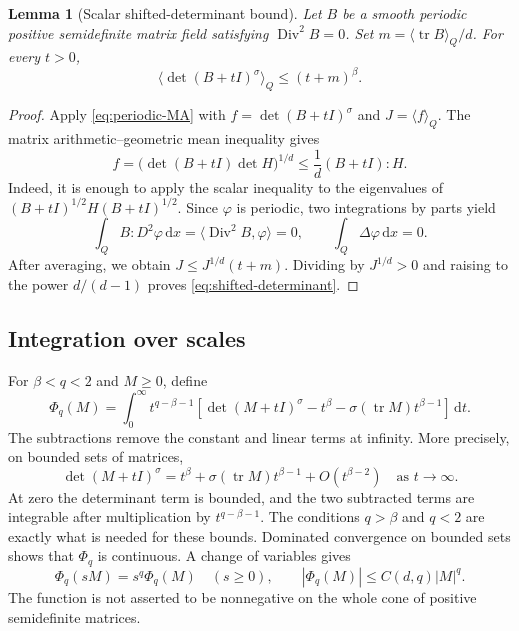 \documentclass[11pt,a4paper,reqno]{amsart}
\theoremstyle{plain}
\newtheorem{lemma}[theorem]{Lemma}
\theoremstyle{remark}
\numberwithin{equation}{section}
\newcommand{\dd}{\,\mathrm d}
\newcommand{\avg}[1]{\langle#1\rangle_Q}
\DeclareMathOperator{\tr}{tr}
\DeclareMathOperator{\Div}{Div}
\begin{document}
\begin{lemma}[Scalar shifted-determinant bound]\label{lem:determinant}
Let $B$ be a smooth periodic positive semidefinite matrix field satisfying $\Div^2B=0$. Set $m=\avg{\tr B}/d$. For every $t>0$,
\begin{equation}\label{eq:shifted-determinant}
 \avg{\det(B+tI)^\sigma}\le(t+m)^\beta.
\end{equation}
\end{lemma}
\begin{proof}
Apply \eqref{eq:periodic-MA} with $f=\det(B+tI)^\sigma$ and $J=\avg f$. The matrix arithmetic--geometric mean inequality gives
\[
 f=\bigl(\det(B+tI)\det H\bigr)^{1/d}
 \le\frac1d(B+tI):H.
\]
Indeed, it is enough to apply the scalar inequality to the eigenvalues of $(B+tI)^{1/2}H(B+tI)^{1/2}$. Since $\varphi$ is periodic, two integrations by parts yield
\[
 \int_Q B:D^2\varphi\dd x=\langle\Div^2B,\varphi\rangle=0,
 \qquad \int_Q\Delta\varphi\dd x=0.
\]
After averaging, we obtain $J\le J^{1/d}(t+m)$. Dividing by $J^{1/d}>0$ and raising to the power $d/(d-1)$ proves \eqref{eq:shifted-determinant}.
\end{proof}

\subsection{Integration over scales}
For $\beta<q<2$ and $M\ge0$, define
\begin{equation}\label{eq:Phi-definition}
 \Phi_q(M)=\int_0^\infty t^{q-\beta-1}
 \left[\det(M+tI)^\sigma-t^\beta
                  -\sigma(\tr M)t^{\beta-1}\right]\dd t.
\end{equation}
The subtractions remove the constant and linear terms at infinity. More precisely, on bounded sets of matrices,
\[
 \det(M+tI)^\sigma
 =t^\beta+\sigma(\tr M)t^{\beta-1}+O(t^{\beta-2})
 \quad\text{as }t\to\infty.
\]
At zero the determinant term is bounded, and the two subtracted terms are integrable after multiplication by $t^{q-\beta-1}$. The conditions $q>\beta$ and $q<2$ are exactly what is needed for these bounds. Dominated convergence on bounded sets shows that $\Phi_q$ is continuous. A change of variables gives
\begin{equation}\label{eq:Phi-growth}
 \Phi_q(sM)=s^q\Phi_q(M)\quad(s\ge0),\qquad
 |\Phi_q(M)|\le C(d,q)|M|^q.
\end{equation}
The function is not asserted to be nonnegative on the whole cone of positive semidefinite matrices.
\end{document}
